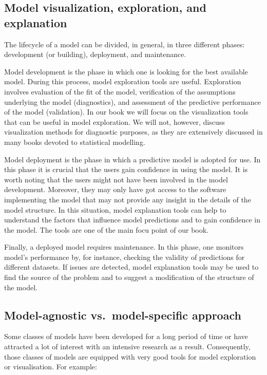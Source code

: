 \documentclass[12pt,]{krantz}
\theoremstyle{definition}
\theoremstyle{definition}
\theoremstyle{definition}
\theoremstyle{remark}
\begin{document}
\hypertarget{model-visualization-exploration-and-explanation}{%
\subsection{Model visualization, exploration, and
explanation}\label{model-visualization-exploration-and-explanation}}

The lifecycle of a model can be divided, in general, in three different
phases: development (or building), deployment, and maintenance.

Model development is the phase in which one is looking for the best
available model. During this process, model exploration tools are
useful. Exploration involves evaluation of the fit of the model,
verification of the assumptions underlying the model (diagnostics), and
assessment of the predictive performance of the model (validation). In
our book we will focus on the visualization tools that can be useful in
model exploration. We will not, however, discuss visualization methods
for diagnostic purposes, as they are extensively discussed in many books
devoted to statistical modelling.

Model deployment is the phase in which a predictive model is adopted for
use. In this phase it is crucial that the users gain confidence in using
the model. It is worth noting that the users might not have been
involved in the model development. Moreover, they may only have got
access to the software implementing the model that may not provide any
insight in the details of the model structure. In this situation, model
explanation tools can help to understand the factors that influence
model predictions and to gain confidence in the model. The tools are one
of the main focu point of our book.

Finally, a deployed model requires maintenance. In this phase, one
monitors model's performance by, for instance, checking the validity of
predictions for different datasets. If issues are detected, model
explanation tools may be used to find the source of the problem and to
suggest a modification of the structure of the model.

\hypertarget{model-agnostic-vs.model-specific-approach}{%
\subsection{Model-agnostic vs.~model-specific
approach}\label{model-agnostic-vs.model-specific-approach}}

Some classes of models have been developed for a long period of time or
have attracted a lot of interest with an intensive research as a result.
Consequently, those classes of models are equipped with very good tools
for model exploration or visualisation. For example:
\end{document}
